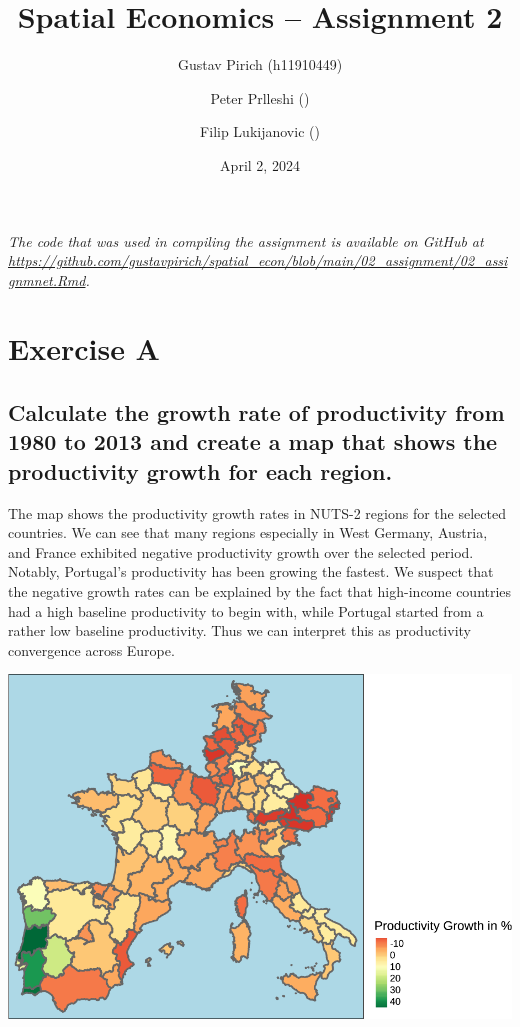 \documentclass[
  a4paper,
]{article}
\title{\textbf{Spatial Economics -- Assignment 2}}
\author{Gustav Pirich (h11910449) \and Peter Prlleshi () \and Filip
Lukijanovic ()}
\date{April 2, 2024}
\begin{document}
\maketitle

{
\hypersetup{linkcolor=}
\setcounter{tocdepth}{2}
\tableofcontents
}
\vspace{2em}

\begin{tcolorbox}
\centering \itshape The code that was used in compiling the assignment is available on GitHub at \url{https://github.com/gustavpirich/spatial_econ/blob/main/02_assignment/02_assignmnet.Rmd}.
\end{tcolorbox}

\newpage

\hypertarget{exercise-a}{%
\section{Exercise A}\label{exercise-a}}

\hypertarget{calculate-the-growth-rate-of-productivity-from-1980-to-2013-and-create-a-map-that-shows-the-productivity-growth-for-each-region.}{%
\subsection{Calculate the growth rate of productivity from 1980 to 2013
and create a map that shows the productivity growth for each
region.}\label{calculate-the-growth-rate-of-productivity-from-1980-to-2013-and-create-a-map-that-shows-the-productivity-growth-for-each-region.}}

The map shows the productivity growth rates in NUTS-2 regions for the
selected countries. We can see that many regions especially in West
Germany, Austria, and France exhibited negative productivity growth over
the selected period. Notably, Portugal's productivity has been growing
the fastest. We suspect that the negative growth rates can be explained
by the fact that high-income countries had a high baseline productivity
to begin with, while Portugal started from a rather low baseline
productivity. Thus we can interpret this as productivity convergence
across Europe.

\includegraphics{02_assignmnet_files/figure-latex/unnamed-chunk-2-1.pdf}
\end{document}

